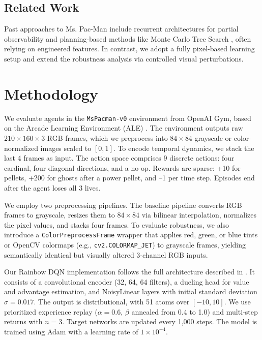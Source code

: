 \documentclass{article}
\begin{document}
\subsection{Related Work}
Past approaches to Ms. Pac-Man include recurrent architectures for partial observability \cite{toromanoff2019deep} and planning-based methods like Monte Carlo Tree Search \cite{pieters2016monte}, often relying on engineered features. In contrast, we adopt a fully pixel-based learning setup and extend the robustness analysis via controlled visual perturbations.

\section{Methodology}

We evaluate agents in the \texttt{MsPacman-v0} environment from OpenAI Gym, based on the Arcade Learning Environment (ALE) \cite{ale}. The environment outputs raw $210 \times 160 \times 3$ RGB frames, which we preprocess into $84 \times 84$ grayscale or color-normalized images scaled to $[0, 1]$. To encode temporal dynamics, we stack the last 4 frames as input. The action space comprises 9 discrete actions: four cardinal, four diagonal directions, and a no-op. Rewards are sparse: +10 for pellets, +200 for ghosts after a power pellet, and –1 per time step. Episodes end after the agent loses all 3 lives.

We employ two preprocessing pipelines. The baseline pipeline converts RGB frames to grayscale, resizes them to $84 \times 84$ via bilinear interpolation, normalizes the pixel values, and stacks four frames. To evaluate robustness, we also introduce a \texttt{ColorPreprocessFrame} wrapper that applies red, green, or blue tints or OpenCV colormaps (e.g., \texttt{cv2.COLORMAP\_JET}) to grayscale frames, yielding semantically identical but visually altered 3-channel RGB inputs.

Our Rainbow DQN implementation follows the full architecture described in \cite{hessel2018rainbow}. It consists of a convolutional encoder (32, 64, 64 filters), a dueling head for value and advantage estimation, and NoisyLinear layers with initial standard deviation $\sigma=0.017$. The output is distributional, with 51 atoms over $[-10, 10]$. We use prioritized experience replay ($\alpha = 0.6$, $\beta$ annealed from 0.4 to 1.0) and multi-step returns with $n = 3$. Target networks are updated every 1,000 steps. The model is trained using Adam with a learning rate of $1 \times 10^{-4}$.
\end{document}
